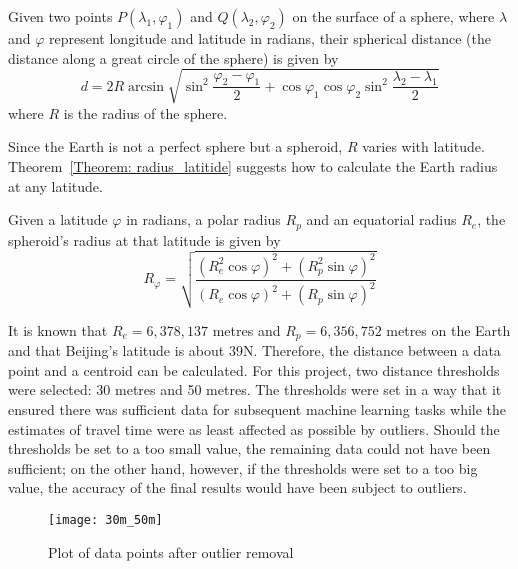\begin{theorem}\label{Theorem: haversine}
Given two points $P(\lambda_1,\varphi_1)$ and $Q(\lambda_2,\varphi_2)$ on the surface of a sphere, where $\lambda$ and $\varphi$ represent longitude and latitude in radians, their spherical distance (the distance along a great circle of the sphere) is given by \cite{FI06}
\begin{equation}
d = 2R\arcsin{\sqrt{\sin^2\frac{\varphi_2 - \varphi_1}{2} + \cos\varphi_1\cos\varphi_2\sin^2\frac{\lambda_2 - \lambda_1}{2}}} 
\end{equation}
where $R$ is the radius of the sphere. 
\end{theorem}

Since the Earth is not a perfect sphere but a spheroid, $R$ varies with latitude. Theorem~\ref{Theorem: radius_latitide} suggests how to calculate the Earth radius at any latitude. 

\begin{theorem}\label{Theorem: radius_latitide}
Given a latitude $\varphi$ in radians, a polar radius $R_{p}$ and an equatorial radius $R_{e}$, the spheroid's radius at that latitude is given by \cite{EAR17}
\begin{equation}
R_{\varphi} = \sqrt{\frac{(R_{e}^2\cos\varphi)^2 + (R_{p}^2\sin\varphi)^2}{(R_{e}\cos\varphi)^2 + (R_{p}\sin\varphi)^2}}
\end{equation}
\end{theorem}

It is known that $R_{e} = 6,378,137$ metres and $R_{p} = 6,356,752$ metres on the Earth \cite{NASA16} and that Beijing's latitude is about 39\textdegree N. Therefore, the distance between a data point and a centroid can be calculated. For this project, two distance thresholds were selected: 30 metres and 50 metres. The thresholds were set in a way that it ensured there was sufficient data for subsequent machine learning tasks while the estimates of travel time were as least affected as possible by outliers. Should the thresholds be set to a too small value, the remaining data could not have been sufficient; on the other hand, however, if the thresholds were set to a too big value, the accuracy of the final results would have been subject to outliers. 

\begin{figure}[h]
\texttt{[image: 30m\_50m]}
\centering
\caption{Plot of data points after outlier removal}\label{Fig:after_removal}
\end{figure}


